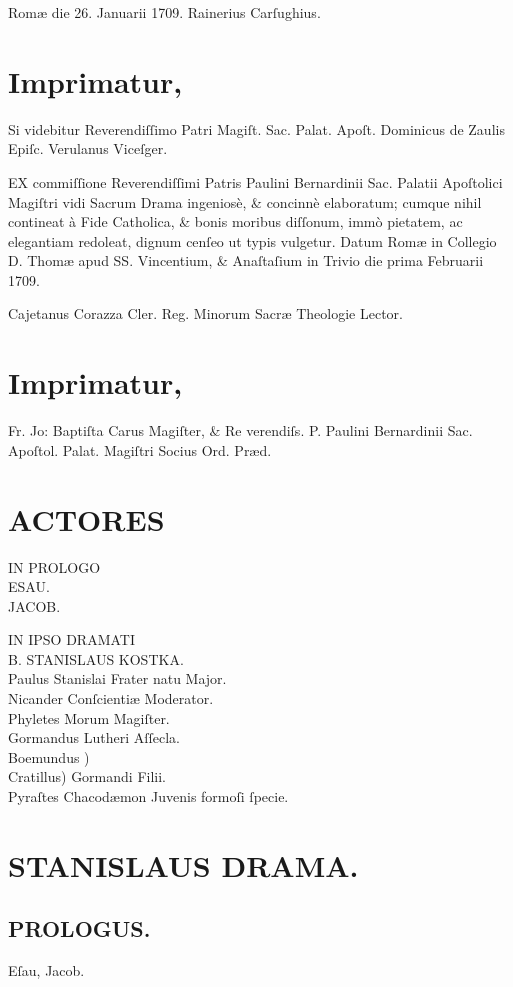 \documentclass[a4paper,12pt]{article}
\begin{document}
Romæ die 26. Januarii 1709.
Rainerius Carſughius.

\section{Imprimatur,}
\label{sec:org51227de}
Si videbitur Reverendiſſimo Patri Magiſt. Sac. Palat. Apoſt.
Dominicus de Zaulis Epiſc. Verulanus Viceſger.

EX commiſſione Reverendiſſimi Patris Paulini Bernardinii Sac. Palatii Apoſtolici Magiſtri vidi Sacrum Drama ingeniosè, \& concinnè elaboratum; cumque nihil contineat à Fide Catholica, \& bonis moribus diſſonum, immò pietatem, ac elegantiam redoleat, dignum cenſeo ut typis vulgetur. Datum Romæ in Collegio D. Thomæ apud SS. Vincentium, \& Anaſtaſium in Trivio die prima Februarii 1709.

Cajetanus Corazza Cler. Reg. Minorum Sacræ Theologie Lector.

\section{Imprimatur,}
\label{sec:org12d1751}
Fr. Jo: Baptiſta Carus Magiſter, \& Re verendiſs. P. Paulini Bernardinii Sac. Apoſtol. Palat. Magiſtri Socius Ord. Præd.


\section{ACTORES}
\label{sec:org64ac4e5}
IN PROLOGO\\[0pt]
ESAU.\\[0pt]
JACOB.

\noindent IN IPSO DRAMATI\\[0pt]
B. STANISLAUS KOSTKA.\\[0pt]
Paulus Stanislai Frater natu Major.\\[0pt]
Nicander Conſcientiæ Moderator.\\[0pt]
Phyletes Morum Magiſter.\\[0pt]
Gormandus Lutheri Aſſecla.\\[0pt]
Boemundus )\\[0pt]
Cratillus) Gormandi Filii.\\[0pt]
Pyraſtes Chacodæmon Juvenis formoſi ſpecie.


\section{STANISLAUS DRAMA.}
\label{sec:org1c98a58}
\subsection{PROLOGUS.}
\label{sec:org092f4f6}
Eſau, Jacob.
\end{document}
